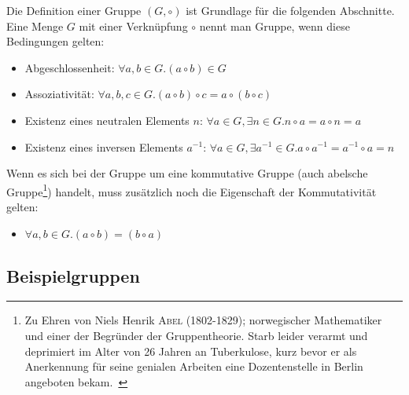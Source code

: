 \documentclass[12pt,a4paper, usenames, dvipsnames]{article}
\begin{document}
Die Definition einer Gruppe $(G, \circ)$ ist Grundlage für die folgenden Abschnitte. Eine Menge $G$ mit einer Verknüpfung $\circ$ nennt man Gruppe, wenn diese Bedingungen gelten: 
\begin{itemize}
\item Abgeschlossenheit: $\forall a,b \in G.(a \circ b) \in G $
\item Assoziativität: $\forall a,b,c \in G.(a \circ b) \circ c = a \circ (b \circ c)$
\item Existenz eines neutralen Elements $n$: $\forall a \in G, \exists n \in G.n \circ a = a \circ n = a$ 
\item Existenz eines inversen Elements $a^{-1}$: $\forall a \in G, \exists a^{-1} \in G. a \circ a^{-1} = a^{-1} \circ a = n$ 
\end{itemize}
Wenn es sich bei der Gruppe um eine kommutative Gruppe (auch abelsche Gruppe\footnote{\glqq Zu Ehren von Niels Henrik \textsc{Abel} (1802-1829); norwegischer Mathematiker und einer der Begründer der Gruppentheorie. Starb leider verarmt und deprimiert im Alter von 26 Jahren an Tuberkulose, kurz bevor er als Anerkennung für seine genialen Arbeiten  eine Dozentenstelle in Berlin angeboten bekam.\grqq \  \cite[S.21, Z.23]{Buch}}) handelt, muss zusätzlich noch die Eigenschaft der Kommutativität gelten: 
\begin{itemize}
\item $\forall a,b \in G.(a \circ b) = (b \circ a) $
\end{itemize}
%
%
%
%
%
%
%
%
%
%
%
%
\subsection*{Beispielgruppen} 
\end{document}
